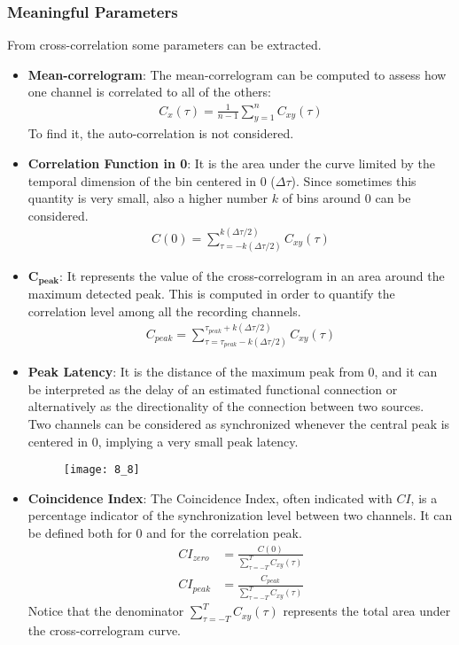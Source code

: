 \subsubsection{Meaningful Parameters}
From cross-correlation some parameters can be extracted.
\begin{itemize}
    \item \textbf{Mean-correlogram}: The mean-correlogram can be computed to assess how
          one channel is correlated to all of the others:
          \begin{align*}
              C_x(\tau)=\frac{1}{n-1}\sum_{y=1}^{n}C_{xy}(\tau)
          \end{align*}
          To find it, the auto-correlation is not considered.
    \item \textbf{Correlation Function in 0}: It is the area under the curve limited by the
          temporal dimension of the bin centered in 0 (\(\Delta\tau\)). Since sometimes this
          quantity is very small, also a higher number \(k\) of bins around 0 can be considered.
          \begin{align*}
              C(0)=\sum_{\tau=-k(\Delta\tau/2)}^{k(\Delta\tau/2)}C_{xy}(\tau)
          \end{align*}
    \item \(\mathbf{C_{peak}}\): It represents the value of the cross-correlogram in
          an area around the maximum detected peak. This is computed in order to quantify the
          correlation level among all the recording channels.
          \begin{align*}
              C_{peak}=\sum_{\tau=\tau_{peak}-k(\Delta\tau/2)}^{\tau_{peak}+k(\Delta\tau/2)}C_{xy}(\tau)
          \end{align*}
    \item \textbf{Peak Latency}: It is the distance of the maximum peak from 0, and it can
          be interpreted as the delay of an estimated functional connection or alternatively as
          the directionality of the connection between two sources. \\
          Two channels can be considered as synchronized whenever the central peak is centered in
          0, implying a very small peak latency.
          \begin{figure}[H]
              \texttt{[image: 8\_8]}
              \centering
          \end{figure}
    \item \textbf{Coincidence Index}: The Coincidence Index, often indicated with \(CI\),
          is a percentage indicator of the synchronization level between two channels. It can be
          defined both for 0 and for the correlation peak.
          \begin{align*}
              CI_{zero} & = \frac{C(0)}{\sum_{\tau=-T}^{T}C_{xy}(\tau)}     \\
              CI_{peak} & = \frac{C_{peak}}{\sum_{\tau=-T}^{T}C_{xy}(\tau)}
          \end{align*}
          Notice that the denominator \(\sum_{\tau=-T}^{T}C_{xy}(\tau)\) represents the
          total area under the cross-correlogram curve.
\end{itemize}

